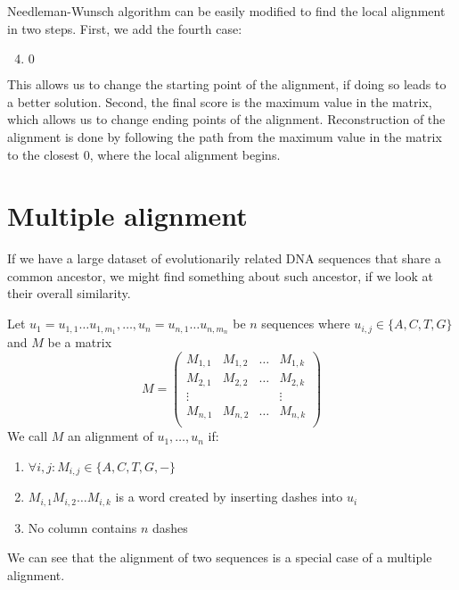 Needleman-Wunsch algorithm can be easily modified to find the local alignment in two steps.
First, we add the fourth case:
\begin{enumerate}
 \setcounter{enumi}{3}
\item $0$
\end{enumerate}
This allows us to change the starting point of the alignment, if doing so leads to a better solution.
Second, the final score is the maximum value in the matrix, which allows us to change ending points of the alignment.
Reconstruction of the alignment is done by following the path from the maximum value in the matrix to the closest $0$, 
where the local alignment begins.

\section{Multiple alignment}
If we have a large dataset of evolutionarily related DNA sequences that share a common ancestor, we might find something about such ancestor, if we look at their overall similarity.

\begin{definition}
Let $u_1=u_{1,1} \dots u_{1,m_1}, \ldots, u_n=u_{n,1} \dots u_{n,m_n}$ be $n$ sequences where $u_{i,j} \in \{A, C, T, G\}$ and $M$ be a matrix
$$M=
\begin{pmatrix}
  M_{1,1} & M_{1,2} & \dots & M_{1,k} \\
  M_{2,1} & M_{2,2} & \dots & M_{2,k} \\
  \vdots&&&\vdots\\
  M_{n,1} & M_{n,2} & \dots & M_{n,k} \\
\end{pmatrix}$$
We call $M$ an alignment of $u_1, \dots, u_n$ if:
\begin{enumerate}
\item $\forall i,j : M_{i,j}\in \{A,C,T,G,-\}$
\item $M_{i,1} M_{i,2} \dots M_{i,k}$ is a word created by inserting dashes into $u_i$
\item No column contains $n$ dashes
\end{enumerate}
\end{definition}

We can see that the alignment of two sequences is a special case of a multiple alignment.

